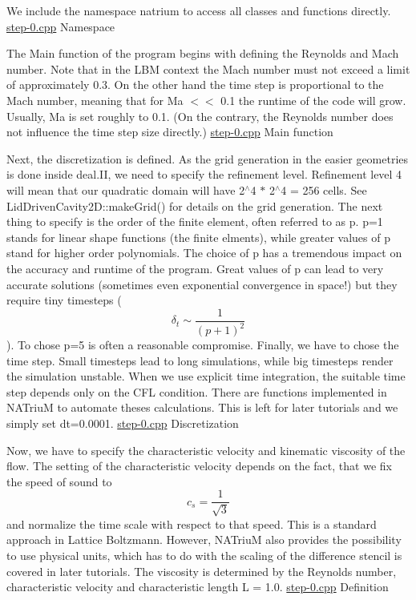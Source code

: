 We include the namespace natrium to access all classes and functions directly.  \hyperlink{step-0_8cpp}{step-\/0.cpp} Namespace

The Main function of the program begins with defining the Reynolds and Mach number. Note that in the LBM context the Mach number must not exceed a limit of approximately 0.3. On the other hand the time step is proportional to the Mach number, meaning that for Ma $<$$<$ 0.1 the runtime of the code will grow. Usually, Ma is set roughly to 0.1. (On the contrary, the Reynolds number does not influence the time step size directly.)  \hyperlink{step-0_8cpp}{step-\/0.cpp} Main function

Next, the discretization is defined. As the grid generation in the easier geometries is done inside deal.II, we need to specify the refinement level. Refinement level 4 will mean that our quadratic domain will have 2$^\wedge$4 $\ast$ 2$^\wedge$4 = 256 cells. See LidDrivenCavity2D::makeGrid() for details on the grid generation. The next thing to specify is the order of the finite element, often referred to as p. p=1 stands for linear shape functions (the finite elments), while greater values of p stand for higher order polynomials. The choice of p has a tremendous impact on the accuracy and runtime of the program. Great values of p can lead to very accurate solutions (sometimes even exponential convergence in space!) but they require tiny timesteps (\[ \delta_t \sim \frac{1}{(p+1)^2} \]). To chose p=5 is often a reasonable compromise. Finally, we have to chose the time step. Small timesteps lead to long simulations, while big timesteps render the simulation unstable. When we use explicit time integration, the suitable time step depends only on the CFL condition. There are functions implemented in NATriuM to automate theses calculations. This is left for later tutorials and we simply set dt=0.0001.  \hyperlink{step-0_8cpp}{step-\/0.cpp} Discretization

Now, we have to specify the characteristic velocity and kinematic viscosity of the flow. The setting of the characteristic velocity depends on the fact, that we fix the speed of sound to \[ c_s = \frac{1}{\sqrt{3}} \] and normalize the time scale with respect to that speed. This is a standard approach in Lattice Boltzmann. However, NATriuM also provides the possibility to use physical units, which has to do with the scaling of the difference stencil is covered in later tutorials. The viscosity is determined by the Reynolds number, characteristic velocity and characteristic length L = 1.0.  \hyperlink{step-0_8cpp}{step-\/0.cpp} Definition

